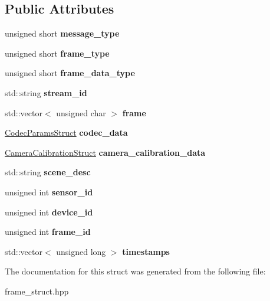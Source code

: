 \subsection*{Public Attributes}
\begin{DoxyCompactItemize}
\item 
\mbox{\label{structFrameStruct_ad6702ce5ca609b8048aa79d0fb98021f}} 
unsigned short {\bfseries message\+\_\+type}
\item 
\mbox{\label{structFrameStruct_a00c8ab2967e64259c6e1567dd433f6a2}} 
unsigned short {\bfseries frame\+\_\+type}
\item 
\mbox{\label{structFrameStruct_afca3eedd6ed6014396d971809f216710}} 
unsigned short {\bfseries frame\+\_\+data\+\_\+type}
\item 
\mbox{\label{structFrameStruct_a54f1e969bdba6e632ef1ae41b51cfdcb}} 
std\+::string {\bfseries stream\+\_\+id}
\item 
\mbox{\label{structFrameStruct_ad0485c9546835226f74b889ed0a70473}} 
std\+::vector$<$ unsigned char $>$ {\bfseries frame}
\item 
\mbox{\label{structFrameStruct_ad6824268d75b9a33dafd73877d97ddb0}} 
\hyperlink{structCodecParamsStruct}{Codec\+Params\+Struct} {\bfseries codec\+\_\+data}
\item 
\mbox{\label{structFrameStruct_a56d1b011bc144fc52d78012b92334440}} 
\hyperlink{structCameraCalibrationStruct}{Camera\+Calibration\+Struct} {\bfseries camera\+\_\+calibration\+\_\+data}
\item 
\mbox{\label{structFrameStruct_a25310114b5a50e7b250d63698b964885}} 
std\+::string {\bfseries scene\+\_\+desc}
\item 
\mbox{\label{structFrameStruct_a192731b89ae9168d7178fe0e09ffe60d}} 
unsigned int {\bfseries sensor\+\_\+id}
\item 
\mbox{\label{structFrameStruct_ac601402871ae9e1c69f57a5684ef7ffd}} 
unsigned int {\bfseries device\+\_\+id}
\item 
\mbox{\label{structFrameStruct_a7f92f5c04f5fb1b5e2fb38c38668da54}} 
unsigned int {\bfseries frame\+\_\+id}
\item 
\mbox{\label{structFrameStruct_aaed6e37d1511e9b33efa6d141d584438}} 
std\+::vector$<$ unsigned long $>$ {\bfseries timestamps}
\end{DoxyCompactItemize}


The documentation for this struct was generated from the following file\+:\begin{DoxyCompactItemize}
\item 
frame\+\_\+struct.\+hpp\end{DoxyCompactItemize}
